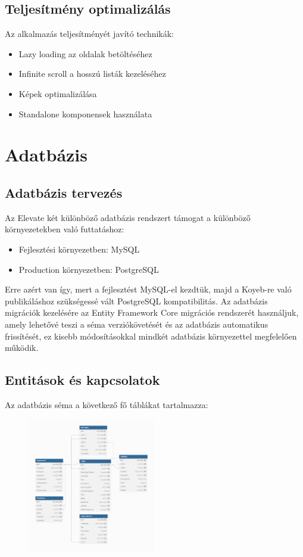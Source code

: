 \documentclass[12pt]{report}
\begin{document}
\section{Teljesítmény optimalizálás}
Az alkalmazás teljesítményét javító technikák:
\begin{itemize}
  \item Lazy loading az oldalak betöltéséhez
  \item Infinite scroll a hosszú listák kezeléséhez
  \item Képek optimalizálása
  \item Standalone komponensek használata
\end{itemize}

\chapter{Adatbázis}
\section{Adatbázis tervezés}
Az Elevate két különböző adatbázis rendszert támogat a különböző környezetekben való futtatáshoz:
\begin{itemize}
  \item Fejlesztési környezetben: MySQL
  \item Production környezetben: PostgreSQL
\end{itemize}

Erre azért van így, mert a fejlesztést MySQL-el kezdtük, majd a Koyeb-re való publikáláshoz szükségessé vált PostgreSQL kompatibilitás. Az adatbázis migrációk kezelésére az Entity Framework Core migrációs rendszerét használjuk, amely lehetővé teszi a séma verziókövetését és az adatbázis automatikus frissítését, ez kisebb módosításokkal mindkét adatbázis környezettel megfelelően működik.

\section{Entitások és kapcsolatok}
Az adatbázis séma a következő fő táblákat tartalmazza:

\begin{figure}[H]
    \centering
    \includegraphics[width=0.5\textwidth, height=0.5\textheight, keepaspectratio]{src/diagram_min.png}
\end{figure}
\end{document}
